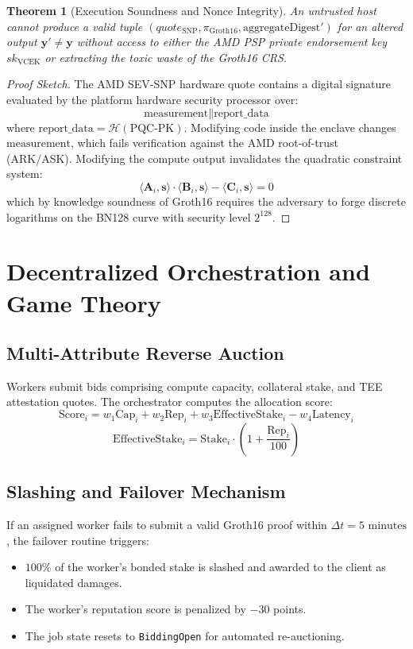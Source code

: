 \documentclass[conference]{IEEEtran}
\newtheorem{theorem}{Theorem}
\begin{document}
\begin{theorem}[Execution Soundness and Nonce Integrity]
An untrusted host cannot produce a valid tuple $(quote_{\text{SNP}}, \pi_{\text{Groth16}}, \text{aggregateDigest}')$ for an altered output $\mathbf{y}' \ne \mathbf{y}$ without access to either the AMD PSP private endorsement key $sk_{\text{VCEK}}$ or extracting the toxic waste of the Groth16 CRS.
\end{theorem}

\begin{proof}[Proof Sketch]
The AMD SEV-SNP hardware quote contains a digital signature evaluated by the platform hardware security processor over:
$$\text{measurement} \parallel \text{report\_data}$$
where $\text{report\_data} = \mathcal{H}(\text{PQC-PK})$. Modifying code inside the enclave changes $\text{measurement}$, which fails verification against the AMD root-of-trust (ARK/ASK). Modifying the compute output invalidates the quadratic constraint system:
$$\langle \mathbf{A}_i, \mathbf{s} \rangle \cdot \langle \mathbf{B}_i, \mathbf{s} \rangle - \langle \mathbf{C}_i, \mathbf{s} \rangle = 0$$
which by knowledge soundness of Groth16 requires the adversary to forge discrete logarithms on the BN128 curve with security level $2^{128}$.
\end{proof}

\section{Decentralized Orchestration and Game Theory}

\subsection{Multi-Attribute Reverse Auction}
Workers submit bids comprising compute capacity, collateral stake, and TEE attestation quotes. The orchestrator computes the allocation score:
\begin{equation}
\text{Score}_i = w_1 \text{Cap}_i + w_2 \text{Rep}_i + w_3 \text{EffectiveStake}_i - w_4 \text{Latency}_i
\end{equation}
\begin{equation}
\text{EffectiveStake}_i = \text{Stake}_i \cdot \left(1 + \frac{\text{Rep}_i}{100}\right)
\end{equation}

\subsection{Slashing and Failover Mechanism}
If an assigned worker fails to submit a valid Groth16 proof within $\Delta t = 5\text{ minutes}$, the failover routine triggers:
\begin{itemize}
    \item $100\%$ of the worker's bonded stake is slashed and awarded to the client as liquidated damages.
    \item The worker's reputation score is penalized by $-30$ points.
    \item The job state resets to \texttt{BiddingOpen} for automated re-auctioning.
\end{itemize}
\end{document}
